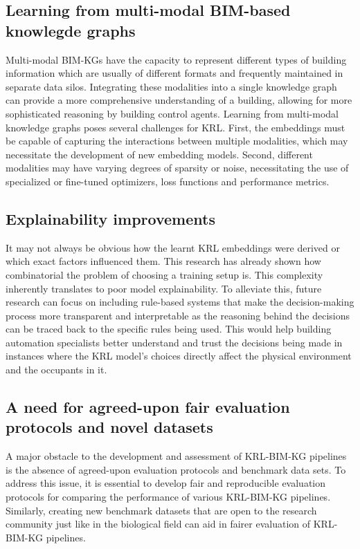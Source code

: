 \subsection{Learning from multi-modal \ac{BIM}-based knowlegde graphs}
Multi-modal \acp{BIM-KG} have the capacity to represent different types of building information which are usually of different formats and frequently maintained in separate data silos. Integrating these modalities into a single knowledge graph can provide a more comprehensive understanding of a building, allowing for more sophisticated reasoning by building control agents. Learning from multi-modal knowledge graphs poses several challenges for \ac{KRL}. First, the embeddings must be capable of capturing the interactions between multiple modalities, which may necessitate the development of new embedding models. Second, different modalities may have varying degrees of sparsity or noise, necessitating the use of specialized or fine-tuned optimizers, loss functions and performance metrics.

\subsection{Explainability improvements}
It may not always be obvious how the learnt \ac{KRL} embeddings were derived or which exact factors influenced them. This research has already shown how combinatorial the problem of choosing a training setup is. This complexity inherently translates to poor model explainability. To alleviate this, future research can focus on including rule-based systems that make the decision-making process more transparent and interpretable as the reasoning behind the decisions can be traced back to the specific rules being used. This would help building automation specialists better understand and trust the decisions being made in instances where the \ac{KRL} model's choices directly affect the physical environment and the occupants in it. 

\subsection{A need for agreed-upon fair evaluation protocols and novel datasets}
A major obstacle to the development and assessment of \ac{KRL}-\ac{BIM-KG} pipelines is the absence of agreed-upon evaluation protocols and benchmark data sets. To address this issue, it is essential to develop fair and reproducible evaluation protocols for comparing the performance of various \ac{KRL}-\ac{BIM-KG} pipelines. Similarly, creating new benchmark datasets that are open to the research community just like in the biological field can aid in fairer evaluation of \ac{KRL}-\ac{BIM-KG} pipelines.

